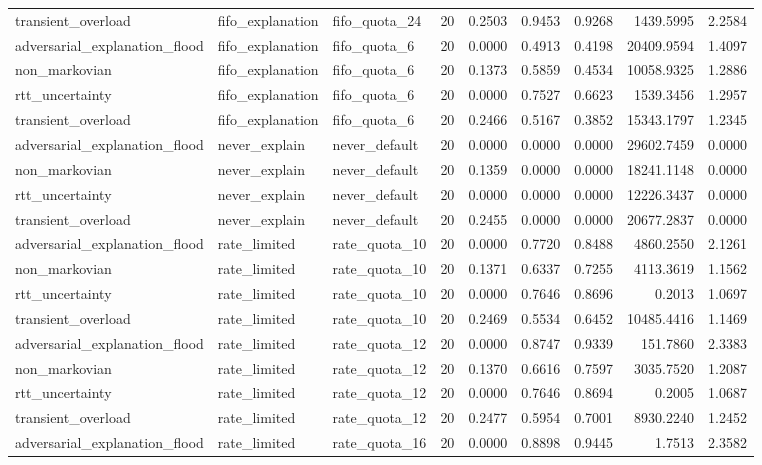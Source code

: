\begin{table}[t]
\begin{tabular}{lllrrrrrr}
transient\_overload & fifo\_explanation & fifo\_quota\_24 & 20 & 0.2503 & 0.9453 & 0.9268 & 1439.5995 & 2.2584 \\
adversarial\_explanation\_flood & fifo\_explanation & fifo\_quota\_6 & 20 & 0.0000 & 0.4913 & 0.4198 & 20409.9594 & 1.4097 \\
non\_markovian & fifo\_explanation & fifo\_quota\_6 & 20 & 0.1373 & 0.5859 & 0.4534 & 10058.9325 & 1.2886 \\
rtt\_uncertainty & fifo\_explanation & fifo\_quota\_6 & 20 & 0.0000 & 0.7527 & 0.6623 & 1539.3456 & 1.2957 \\
transient\_overload & fifo\_explanation & fifo\_quota\_6 & 20 & 0.2466 & 0.5167 & 0.3852 & 15343.1797 & 1.2345 \\
adversarial\_explanation\_flood & never\_explain & never\_default & 20 & 0.0000 & 0.0000 & 0.0000 & 29602.7459 & 0.0000 \\
non\_markovian & never\_explain & never\_default & 20 & 0.1359 & 0.0000 & 0.0000 & 18241.1148 & 0.0000 \\
rtt\_uncertainty & never\_explain & never\_default & 20 & 0.0000 & 0.0000 & 0.0000 & 12226.3437 & 0.0000 \\
transient\_overload & never\_explain & never\_default & 20 & 0.2455 & 0.0000 & 0.0000 & 20677.2837 & 0.0000 \\
adversarial\_explanation\_flood & rate\_limited & rate\_quota\_10 & 20 & 0.0000 & 0.7720 & 0.8488 & 4860.2550 & 2.1261 \\
non\_markovian & rate\_limited & rate\_quota\_10 & 20 & 0.1371 & 0.6337 & 0.7255 & 4113.3619 & 1.1562 \\
rtt\_uncertainty & rate\_limited & rate\_quota\_10 & 20 & 0.0000 & 0.7646 & 0.8696 & 0.2013 & 1.0697 \\
transient\_overload & rate\_limited & rate\_quota\_10 & 20 & 0.2469 & 0.5534 & 0.6452 & 10485.4416 & 1.1469 \\
adversarial\_explanation\_flood & rate\_limited & rate\_quota\_12 & 20 & 0.0000 & 0.8747 & 0.9339 & 151.7860 & 2.3383 \\
non\_markovian & rate\_limited & rate\_quota\_12 & 20 & 0.1370 & 0.6616 & 0.7597 & 3035.7520 & 1.2087 \\
rtt\_uncertainty & rate\_limited & rate\_quota\_12 & 20 & 0.0000 & 0.7646 & 0.8694 & 0.2005 & 1.0687 \\
transient\_overload & rate\_limited & rate\_quota\_12 & 20 & 0.2477 & 0.5954 & 0.7001 & 8930.2240 & 1.2452 \\
adversarial\_explanation\_flood & rate\_limited & rate\_quota\_16 & 20 & 0.0000 & 0.8898 & 0.9445 & 1.7513 & 2.3582 \\

\end{tabular}
\end{table}
